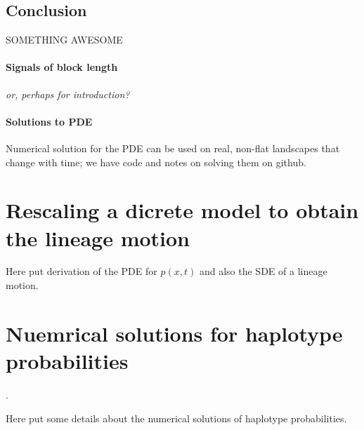 \documentclass[12pt]{article}
\newcommand{\plr}[1]{{\em \color{blue} #1}}
\begin{document}
\subsection*{Conclusion}
SOMETHING AWESOME

\paragraph{Signals of block length}

\plr{or, perhaps for introduction?}



\paragraph{Solutions to PDE}
Numerical solution for the PDE can be used on real, non-flat landscapes that change with time;
we have code and notes on solving them on github.




\appendix

\section{Rescaling a dicrete model to obtain the lineage motion}
\label{apx:lineage_derivation}

Here put derivation of the PDE for $p(x,t)$ and also the SDE of a lineage motion.

\section{Nuemrical solutions for haplotype probabilities}
\label{apx:haplotype_calcs}.

Here put some details about the numerical solutions of haplotype probabilities.
\end{document}
